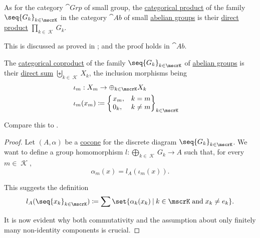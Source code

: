 \begin{proposition}\label{thm:abelian_group_categorical_limits}
  \hfill
  \begin{thmenum}
     As for the category \hyperref[def:group/category]{\( \cat{Grp} \)} of small group, the \hyperref[def:discrete_category_limits]{categorical product} of the family \( \seq{ G_k }_{k \in \mscrK} \) in the category \( \cat{Ab} \) of small \hyperref[def:abelian_group]{abelian groups} is their \hyperref[def:group_direct_product]{direct product} \( \prod_{k \in \mscrK} G_k \).

    This is discussed as proved in ; and the proof holds in \( \cat{Ab} \).

     The \hyperref[def:discrete_category_limits]{categorical coproduct} of the family \( \seq{ G_k }_{k \in \mscrK} \) of \hyperref[def:abelian_group]{abelian groups} is their \hyperref[def:group_direct_sum]{direct sum} \( \biguplus_{k \in \mscrK} X_k \), the inclusion morphisms being
    \begin{equation*}
      \begin{aligned}
         &\iota_m: X_m \to \oplus_{k \in \mscrK} X_k \\
         &\iota_m(x_m) \coloneqq \begin{cases}
          \begin{rcases}
            x_m, &k = m \\
            0_k, &k \neq m
          \end{rcases}_{k \in \mscrK}
        \end{cases}
      \end{aligned}
    \end{equation*}

    Compare this to .
  \end{thmenum}
\end{proposition}
\begin{proof}
   Let \( (A, \alpha) \) be a \hyperref[def:category_of_cones/cocone]{cocone} for the discrete diagram \( \seq{ G_k }_{k \in \mscrK} \). We want to define a group homomorphism \( l: \bigoplus_{k \in \mscrK} G_k \to A \) such that, for every \( m \in \mscrK \),
  \begin{equation*}
    \alpha_m(x) = l_A(\iota_m(x)).
  \end{equation*}

  This suggests the definition
  \begin{equation*}
    l_A(\seq{ x_k }_{k \in \mscrK}) \coloneqq \sum\set{ \alpha_k(x_k) \given k \in \mscrK \T{and} x_k \neq e_k }.
  \end{equation*}

  It is now evident why both commutativity and the assumption about only finitely many non-identity components is crucial.
\end{proof}

